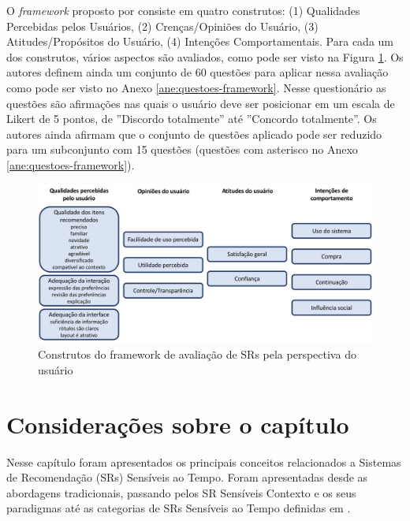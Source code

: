 O \textit{framework} proposto por  consiste em quatro construtos: (1) Qualidades Percebidas pelos
Usuários, (2) Crenças/Opiniões do Usuário, (3) Atitudes/Propósitos do Usuário, (4) Intenções Comportamentais.
Para cada um dos construtos, vários aspectos são avaliados, como pode ser visto na Figura \ref{fig:resque-framework}.
Os autores definem ainda um conjunto de 60 questões para aplicar nessa avaliação como pode ser visto no Anexo
\ref{ane:questoes-framework}. Nesse questionário as questões são afirmações nas quais o usuário deve ser posicionar em
um escala de Likert de 5 pontos, de ''Discordo totalmente'' até ''Concordo totalmente''. Os autores ainda afirmam que o
conjunto de questões aplicado pode ser reduzido para um subconjunto com 15 questões (questões com asterisco no Anexo
\ref{ane:questoes-framework}).

\begin{figure}[htb]
  \caption{\label{fig:resque-framework}Construtos do framework de avaliação de SRs pela perspectiva do usuário}
  \begin{center}
      \includegraphics[scale=0.4]{./Figuras/resque-framework-traduzido.png}
  \end{center}
\end{figure}

\section{Considerações sobre o capítulo}

Nesse capítulo foram apresentados os principais conceitos relacionados a Sistemas de Recomendação (SRs) Sensíveis ao Tempo.
Foram apresentadas desde as abordagens tradicionais, passando pelos SR Sensíveis Contexto e os seus paradigmas até as
categorias de SRs Sensíveis ao Tempo definidas em .

